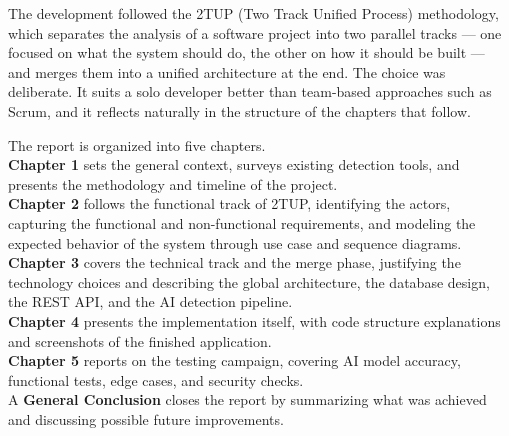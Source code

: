 The development followed the 2TUP (Two Track Unified Process) methodology, which separates the analysis of a software project into two parallel tracks --- one focused on what the system should do, the other on how it should be built --- and merges them into a unified architecture at the end. The choice was deliberate. It suits a solo developer better than team-based approaches such as Scrum, and it reflects naturally in the structure of the chapters that follow.

The report is organized into five chapters.\\[6pt]
\textbf{Chapter 1} sets the general context, surveys existing detection tools, and presents the methodology and timeline of the project.\\[6pt]
\textbf{Chapter 2} follows the functional track of 2TUP, identifying the actors, capturing the functional and non-functional requirements, and modeling the expected behavior of the system through use case and sequence diagrams.\\[6pt]
\textbf{Chapter 3} covers the technical track and the merge phase, justifying the technology choices and describing the global architecture, the database design, the REST API, and the AI detection pipeline.\\[6pt]
\textbf{Chapter 4} presents the implementation itself, with code structure explanations and screenshots of the finished application.\\[6pt]
\textbf{Chapter 5} reports on the testing campaign, covering AI model accuracy, functional tests, edge cases, and security checks.\\[6pt]
A \textbf{General Conclusion} closes the report by summarizing what was achieved and discussing possible future improvements.